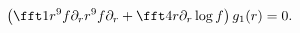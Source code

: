 \begin{equation}
\left(\fft1{r^9f}\partial_rr^9f\partial_r+\fft4r\partial_r\log
f\right)g_1(r)=0.
\label{eq:g1eqn}
\end{equation}

